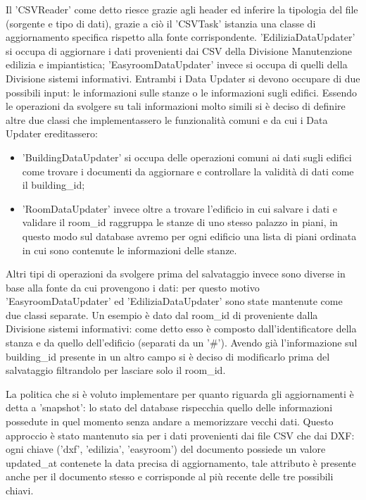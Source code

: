 \documentclass[12pt]{report}
\begin{document}
Il 'CSVReader' come detto riesce grazie agli header ed inferire la tipologia del file (sorgente e tipo di dati), grazie a ciò il 'CSVTask' istanzia una classe di aggiornamento specifica rispetto alla fonte corrispondente.
'EdiliziaDataUpdater' si occupa di aggiornare i dati provenienti dai CSV della Divisione Manutenzione edilizia e impiantistica; 'EasyroomDataUpdater' invece si occupa di quelli della Divisione sistemi informativi.
Entrambi i Data Updater si devono occupare di due possibili input: le informazioni sulle stanze o le informazioni sugli edifici.
Essendo le operazioni da svolgere su tali informazioni molto simili si è deciso di definire altre due classi che implementassero le funzionalità comuni e da cui i Data Updater ereditassero:
\begin{itemize}
\item 'BuildingDataUpdater' si occupa delle operazioni comuni ai dati sugli edifici come trovare i documenti da aggiornare e controllare la validità di dati come il building\_id;
\item 'RoomDataUpdater' invece oltre a trovare l'edificio in cui salvare i dati e validare il room\_id raggruppa le stanze di uno stesso palazzo in piani, in questo modo sul database avremo per ogni edificio una lista di piani ordinata in cui sono contenute le informazioni delle stanze.
\end{itemize}
Altri tipi di operazioni da svolgere prima del salvataggio invece sono diverse in base alla fonte da cui provengono i dati: per questo motivo 'EasyroomDataUpdater' ed 'EdiliziaDataUpdater' sono state mantenute come due classi separate.
Un esempio è dato dal room\_id di proveniente dalla Divisione sistemi informativi: come detto esso è composto dall'identificatore della stanza e da quello dell'edificio (separati da un '\#'). Avendo già l'informazione sul building\_id presente in un altro campo si è deciso di modificarlo prima del salvataggio filtrandolo per lasciare solo il room\_id.
 

La politica che si è voluto implementare per quanto riguarda gli aggiornamenti è detta a 'snapshot': lo stato del database rispecchia quello delle informazioni possedute in quel momento senza andare a memorizzare vecchi dati.
Questo approccio è stato mantenuto sia per i dati provenienti dai file CSV che dai DXF: ogni chiave ('dxf', 'edilizia', 'easyroom') del documento possiede un valore updated\_at contenete la data precisa di aggiornamento, tale attributo è presente anche per il documento stesso e corrisponde al più recente delle tre possibili chiavi.
\end{document}
